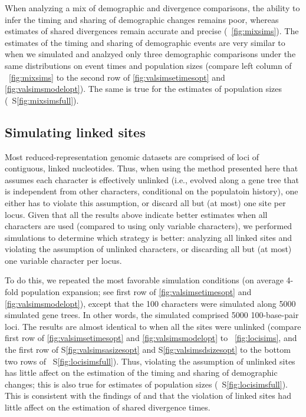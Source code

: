 When analyzing a mix of demographic and divergence comparisons, the ability to
infer the timing and sharing of demographic changes remains poor, whereas
estimates of shared divergences remain accurate and precise
(\fig{}~\ref{fig:mixsims}).
The estimates of the timing and sharing of demographic events are very similar
to when we simulated and analzyed only three demographic comparisons under the
same distributions on event times and population sizes
(compare left column of \fig{}~\ref{fig:mixsims}
to the second row of \figs
\ref{fig:valsimsetimesopt}
and
\ref{fig:valsimsmodelopt}).
The same is true for the estimates of population sizes
(\fig{}~S\ref{fig:mixsimsfull}).

\ifembed{

}{}


\subsection{Simulating linked sites}

Most reduced-representation genomic datasets are comprised of loci of
contiguous, linked nucleotides.
Thus, when using the method presented here that assumes each character is
effectively unlinked (i.e., evolved along a gene tree that is independent from
other characters, conditional on the populatoin history), one either has to
violate this assumption, or discard all but (at most) one site per locus.
Given that all the results above indicate better estimates when all
characters are used (compared to using only variable characters), we
performed simulations to determine which strategy is better:
analyzing all linked sites and violating the assumption of unlinked characters,
or discarding all but (at most) one variable character per locus.

To do this, we repeated the most favorable simulation conditions (on average
4-fold population expansion; see first row of
\figs
\ref{fig:valsimsetimesopt}
and
\ref{fig:valsimsmodelopt}),
except that the 100 characters were simulated along 5000
simulated gene trees.
In other words, the simulated \datasets comprised 5000
100-base-pair loci.
The results are almost identical to when all the sites were unlinked
(compare first row of
\figs
\ref{fig:valsimsetimesopt}
and
\ref{fig:valsimsmodelopt}
to
\fig{}~\ref{fig:locisims},
and the first row of
\figs
S\ref{fig:valsimsasizesopt}
and
S\ref{fig:valsimsdsizesopt}
to the bottom two rows of
\fig{}~S\ref{fig:locisimsfull}).
Thus, violating the assumption of unlinked sites has little
affect on the estimation of the timing and sharing of
demographic changes;
this is also true for estimates of population sizes
(\fig{}~S\ref{fig:locisimsfull}).
This is consistent with the findings of
\citet{Oaks2018ecoevolity} and
\citet{Oaks2018paic}
that the violation of linked sites had little affect on the estimation of
shared divergence times.


